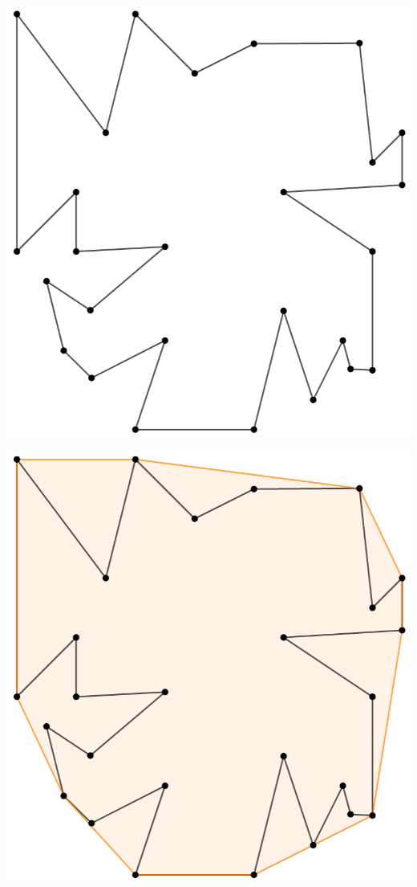 {\begin{frame}
  \centering \includegraphics[width=0.55 \paperwidth]{images/V(q)01.png}
\end{frame}

\begin{frame}
  \centering \includegraphics[width=0.55 \paperwidth]{images/V(q)02.png}
\end{frame}

}
